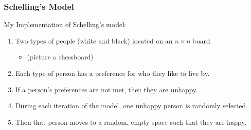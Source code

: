 \documentclass[11pt, handout]{beamer}
\begin{document}
\begin{frame}
    \frametitle{Schelling's Model}
    My Implementation of Schelling's model:
    \begin{enumerate}
        \item Two types of people (white and black) located on an $n \times n$ board.
            \begin{itemize}
                \item (picture a chessboard)
            \end{itemize}
        \item Each type of person has a preference for who they like to live by.
        \item If a person's preferences are not met, then they are unhappy.
        \item During each iteration of the model, one unhappy person is randomly selected.
        \item Then that person moves to a random, empty space such that they are happy.
    \end{enumerate}
\end{frame}
\end{document}
